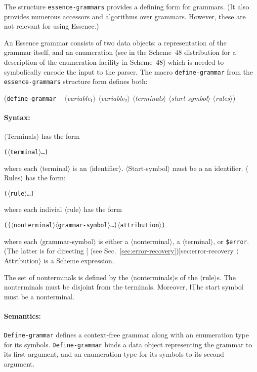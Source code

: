 \documentclass{article}
\newcommand{\meta}[1]{{\noindent\mbox{\textrm{$\langle$#1$\rangle$}}}}
\newcommand{\pproto}[2]{\unskip%
\mbox{\texonly{\spaceskip=0.5em}#1}%
\mbox{ }\texonly{\nobreak}\htmlonly{ }\textrm{#2}}
\newcommand{\proto}[3]{\par\bigskip\begin{flushleft}\pproto{(\texttt{#1}}{\textit{#2})}\hspace*{\fill}{#3}\end{flushleft}}
\newcommand{\dotsfoo}{\ldots\texonly{\thinspace}}
\newcommand{\codefont}[1]{\texttt{#1}}
\begin{document}
The structure \codefont{essence-grammars} provides a defining form for
grammars.  (It also provides numerous accessors and algorithms over
grammars.  However, these are not relevant for using Essence.)

An Essence grammar consists of two data objects: a representation of
the grammar itself, and an enumeration (see 
in the Scheme~48 distribution for a description of the enumeration
facility in Scheme~48) which is needed to symbolically encode the
input to the parser.  The macro \codefont{define-grammar} from the
\codefont{essence-grammars} structure form defines both:

\label{form:define-grammar}
\proto{define-grammar}{ \meta{variable$_1$} \meta{variable$_2$}\hfill\linebreak\texonly{\hspace*{1em}}
    \meta{terminals}
  \meta{start-symbol} \meta{rules}}{syntax}

\paragraph{Syntax:} \meta{Terminals} has the form
%
\begin{alltt}
  (\meta{terminal} \dotsfoo)
\end{alltt}
%
where each \meta{terminal} is an \meta{identifier}.  
\meta{Start-symbol} must
be a an identifier.  \meta{Rules} has the form:
%
\begin{alltt}
  (\meta{rule} \dotsfoo)
\end{alltt}
%
where each indivial \meta{rule} has the form
%
\begin{alltt}
  ((\meta{nonterminal} \meta{grammar-symbol} \dotsfoo) \meta{attribution})
\end{alltt}
%
where each \meta{grammar-symbol} is either a \meta{nonterminal}, a
\meta{terminal}, or \codefont{\$error}.  (The latter is for directing
[ (see
Sec.~\ref{sec:error-recovery})]{sec:error-recovery} \meta{Attribution}
is a Scheme expression.

The set of nonterminals is defined by the \meta{nonterminals}s of the
\meta{rule}s.  The nonterminals must be disjoint from the terminals.
Moreover, lThe start symbol must be a nonterminal.

\paragraph{Semantics:} \codefont{Define-grammar} defines a
context-free grammar along with an enumeration type for its symbols.
\codefont{Define-grammar} binds a data object representing the grammar 
to its first argument, and an enumeration type for its symbols to its
second argument.
\end{document}
